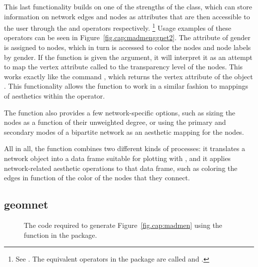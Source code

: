 This last functionality builds on one of the strengths of the  class, which can store information on network edges and nodes as attributes that are then accessible to the user through the  and  operators respectively.%
\footnote{See \citet[p.~22-24]{network}.
The equivalent operators in the  package are called  and .} Usage examples of these operators can be seen in Figure~\ref{fig.cap:madmenggnet2}. The attribute of gender is assigned to nodes, which in turn is accessed to color the nodes and node labels by gender.  If the  function is given the  argument, it will interpret it as an attempt to map the vertex attribute called  to the transparency level of the nodes. This works exactly like the command , which returns the vertex attribute  of the  object . This functionality allows the  function to work in a similar fashion to  mappings of aesthetics within the  operator.

The  function also provides a few network-specific options, such as sizing the nodes as a function of their unweighted degree, or using the primary and secondary modes of a bipartite network as an aesthetic mapping for the nodes. 

All in all, the  function combines two different kinds of processes: it translates a network object into a data frame suitable for plotting with , and it applies network-related aesthetic operations to that data frame, such as coloring the edges in function of the color of the nodes that they connect. 

\subsection{geomnet} 

\begin{figure}[h]
\caption{\label{fig.cap:madmengeomnet} The code required to generate Figure~\ref{fig.cap:madmen} using the  function in the  package.}
\end{figure}

